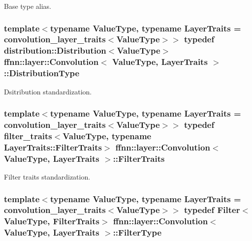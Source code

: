 Base type alias. 

\hypertarget{classffnn_1_1layer_1_1_convolution_a63016232e871a6869432158dda2ff8dc}{
\subsubsection[{Distribution\-Type}]{\setlength{\rightskip}{0pt plus 5cm}template$<$typename Value\-Type, typename Layer\-Traits = convolution\-\_\-layer\-\_\-traits$<$\-Value\-Type$>$$>$ typedef {\bf distribution\-::\-Distribution}$<$Value\-Type$>$ {\bf ffnn\-::layer\-::\-Convolution}$<$ Value\-Type, Layer\-Traits $>$\-::{\bf Distribution\-Type}}}\label{classffnn_1_1layer_1_1_convolution_a63016232e871a6869432158dda2ff8dc}


Dsitribution standardization. 

\hypertarget{classffnn_1_1layer_1_1_convolution_a747e95b6530d029de9ddcfd92cb0317a}{
\subsubsection[{Filter\-Traits}]{\setlength{\rightskip}{0pt plus 5cm}template$<$typename Value\-Type, typename Layer\-Traits = convolution\-\_\-layer\-\_\-traits$<$\-Value\-Type$>$$>$ typedef filter\-\_\-traits$<$Value\-Type, typename Layer\-Traits\-::\-Filter\-Traits$>$ {\bf ffnn\-::layer\-::\-Convolution}$<$ Value\-Type, Layer\-Traits $>$\-::{\bf Filter\-Traits}}}\label{classffnn_1_1layer_1_1_convolution_a747e95b6530d029de9ddcfd92cb0317a}


Filter traits standardization. 

\hypertarget{classffnn_1_1layer_1_1_convolution_a992ae89b4a496563a3a7578d522a8f04}{
\subsubsection[{Filter\-Type}]{\setlength{\rightskip}{0pt plus 5cm}template$<$typename Value\-Type, typename Layer\-Traits = convolution\-\_\-layer\-\_\-traits$<$\-Value\-Type$>$$>$ typedef Filter$<$Value\-Type, {\bf Filter\-Traits}$>$ {\bf ffnn\-::layer\-::\-Convolution}$<$ Value\-Type, Layer\-Traits $>$\-::{\bf Filter\-Type}}}\label{classffnn_1_1layer_1_1_convolution_a992ae89b4a496563a3a7578d522a8f04}


